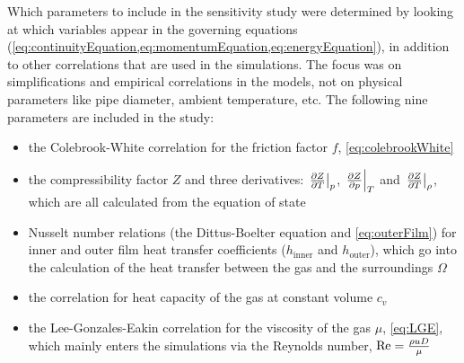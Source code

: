 Which parameters to include in the sensitivity study were determined by looking at which variables appear in the governing equations (\cref{eq:continuityEquation,eq:momentumEquation,eq:energyEquation}), in addition to other correlations that are used in the simulations. The focus was on simplifications and empirical correlations in the models, not on physical parameters like pipe diameter, ambient temperature, etc. %
The following nine parameters are included in the study:
\begin{itemize}
    \item the Colebrook-White correlation for the friction factor $f$, \cref{eq:colebrookWhite}
    
    \item the compressibility factor $Z$ and three derivatives: $\eval{\pd{Z}{T}}_p$, $\eval{\pd{Z}{p}}_T$ and $\eval{\pd{Z}{T}}_\rho$, which are all calculated from the equation of state
    
    \item Nusselt number relations (the Dittus-Boelter equation and \cref{eq:outerFilm}) for inner and outer film heat transfer coefficients ($h_\text{inner}$ and $h_\text{outer}$), which go into the calculation of the heat transfer between the gas and the surroundings $\Omega$
    
    \item the correlation for heat capacity of the gas at constant volume %
    $c_v$
    
    \item the Lee-Gonzales-Eakin correlation for the viscosity of the gas $\mu$, \cref{eq:LGE}, which mainly enters the simulations via the Reynolds number, $\operatorname{R\kern-.04em e} = \frac{\rho u D}{\mu}$
 \end{itemize}


